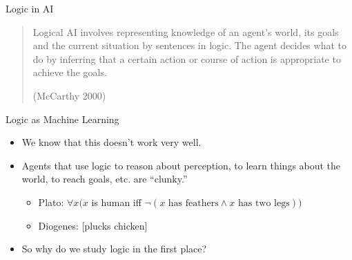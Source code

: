 \documentclass[../slides.tex]{subfiles}
\begin{document}
\begin{frame}{Logic in AI}


    \begin{quote}
     Logical AI involves representing knowledge of an agent’s world,
     its goals and the current situation by sentences in logic. The
     agent decides what to do by inferring that a certain action or
     course of action is appropriate to achieve the goals.
     \begin{flushright}
       (McCarthy 2000)
     \end{flushright}
    \end{quote}
    
\end{frame}


\begin{frame}{Logic as Machine Learning}

  \begin{itemize}
  \item We know that this doesn't work very well.

    \item Agents that use logic to reason about perception, to learn
      things about the world, to reach goals, etc. are ``clunky.''

      \begin{itemize}

      \item Plato: $\forall x(x$ is human iff $\neg(x\text{ has feathers}\land
     x\text{ has two legs}))$

      \item Diogenes: [plucks chicken]

      \end{itemize}

      \item So why do we study logic in the first place?
  \end{itemize}
  
\end{frame}
\end{document}

